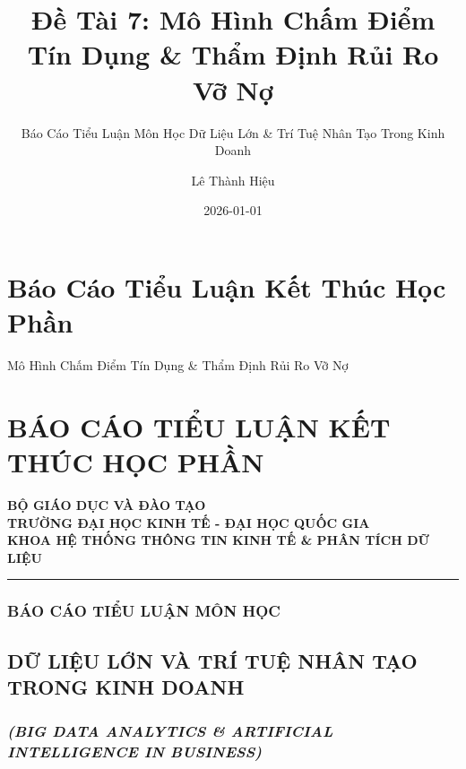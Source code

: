 \documentclass[
  13pt,
  a4paper,
]{report}
\title{Đề Tài 7: Mô Hình Chấm Điểm Tín Dụng \& Thẩm Định Rủi Ro Vỡ Nợ}
\subtitle{Báo Cáo Tiểu Luận Môn Học Dữ Liệu Lớn \& Trí Tuệ Nhân Tạo
Trong Kinh Doanh}
\author{Lê Thành Hiệu}
\date{2026-01-01}
\renewcommand*\contentsname{Table of contents}
\newcommand\contentsname{Table of contents}
\begin{document}
\maketitle

\renewcommand*\contentsname{Table of contents}
{
\setcounter{tocdepth}{2}
\tableofcontents
}


\chapter{Báo Cáo Tiểu Luận Kết Thúc Học
Phần}\label{buxe1o-cuxe1o-tiux1ec3u-luux1eadn-kux1ebft-thuxfac-hux1ecdc-phux1ea7n}

Mô Hình Chấm Điểm Tín Dụng \& Thẩm Định Rủi Ro Vỡ Nợ

\hfill\break


\chapter{BÁO CÁO TIỂU LUẬN KẾT THÚC HỌC
PHẦN}\label{buxe1o-cuxe1o-tiux1ec3u-luux1eadn-kux1ebft-thuxfac-hux1ecdc-phux1ea7n-1}

\textbf{BỘ GIÁO DỤC VÀ ĐÀO TẠO}\\
\textbf{TRƯỜNG ĐẠI HỌC KINH TẾ - ĐẠI HỌC QUỐC GIA}\\
\textbf{KHOA HỆ THỐNG THÔNG TIN KINH TẾ \& PHÂN TÍCH DỮ LIỆU}

\begin{center}\rule{0.5\linewidth}{0.5pt}\end{center}

\subsection{\texorpdfstring{\textbf{BÁO CÁO TIỂU LUẬN MÔN
HỌC}}{BÁO CÁO TIỂU LUẬN MÔN HỌC}}\label{buxe1o-cuxe1o-tiux1ec3u-luux1eadn-muxf4n-hux1ecdc}

\section{\texorpdfstring{\textbf{DỮ LIỆU LỚN VÀ TRÍ TUỆ NHÂN TẠO TRONG
KINH
DOANH}}{DỮ LIỆU LỚN VÀ TRÍ TUỆ NHÂN TẠO TRONG KINH DOANH}}\label{dux1eef-liux1ec7u-lux1edbn-vuxe0-truxed-tuux1ec7-nhuxe2n-tux1ea1o-trong-kinh-doanh}

\subsection{\texorpdfstring{\emph{(BIG DATA ANALYTICS \& ARTIFICIAL
INTELLIGENCE IN
BUSINESS)}}{(BIG DATA ANALYTICS \& ARTIFICIAL INTELLIGENCE IN BUSINESS)}}\label{big-data-analytics-artificial-intelligence-in-business}
\end{document}
